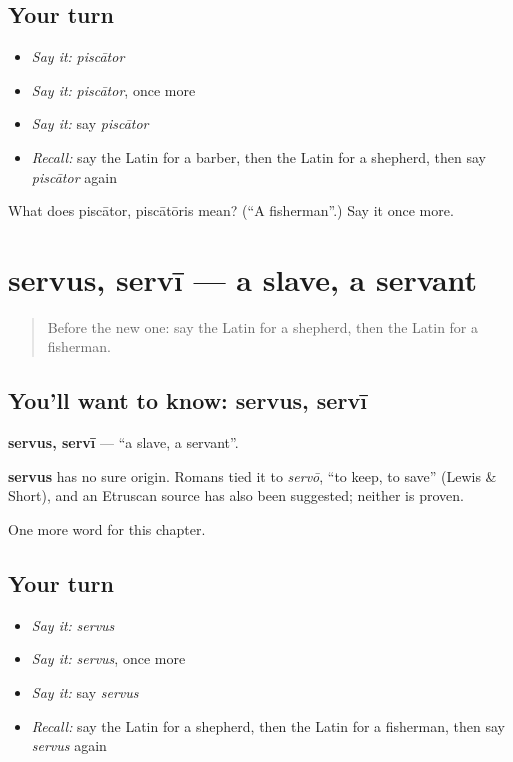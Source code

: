 \subsection*{Your turn}
\begin{itemize}
\raggedright
  \item \emph{Say it:} \emph{piscātor}
  \item \emph{Say it:} \emph{piscātor}, once more
  \item \emph{Say it:} say \emph{piscātor}
  \item \emph{Recall:} say the Latin for a barber, then the Latin for a shepherd, then say \emph{piscātor} again
\end{itemize}

\begin{tcolorbox}[breakable,colback=teal!4,colframe=teal!35!black,title={Before you move on}]
What does piscātor, piscātōris mean? (\textquotedblleft{}A fisherman\textquotedblright{}.) Say it once more.
\end{tcolorbox}
\section[servus, servī]{servus, servī — a slave, a servant}

\label{lesson:LA-C138-servus}



\begin{quote}
Before the new one: say the Latin for a shepherd, then the Latin for a fisherman.
\end{quote}

\subsection*{You'll want to know: servus, servī}
\textbf{servus, servī} — \textquotedblleft{}a slave, a servant\textquotedblright{}.

\begin{cousinweb}
\textbf{servus} has no sure origin. Romans tied it to \emph{servō}, \textquotedblleft{}to keep, to save\textquotedblright{} (Lewis \& Short), and an Etruscan source has also been suggested; neither is proven.
\end{cousinweb}

\begin{grammarlens}[title={What you've built}]
One more word for this chapter.
\end{grammarlens}

\subsection*{Your turn}
\begin{itemize}
\raggedright
  \item \emph{Say it:} \emph{servus}
  \item \emph{Say it:} \emph{servus}, once more
  \item \emph{Say it:} say \emph{servus}
  \item \emph{Recall:} say the Latin for a shepherd, then the Latin for a fisherman, then say \emph{servus} again
\end{itemize}

